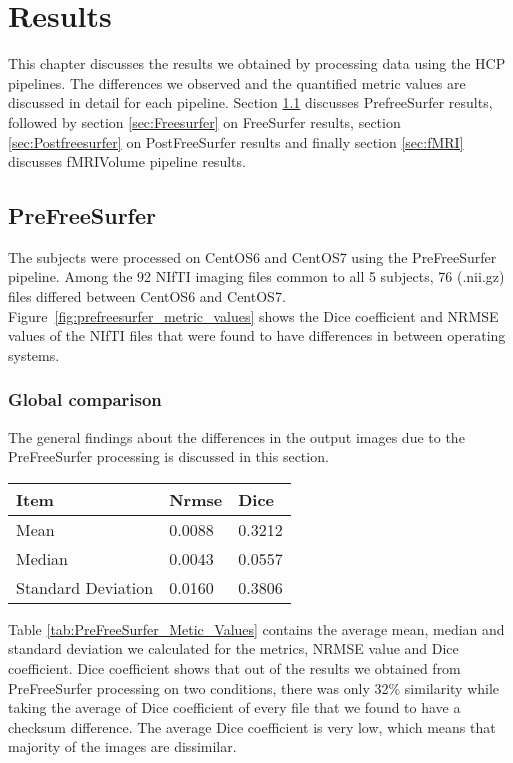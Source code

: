 \chapter{Results}\label{results}
This chapter discusses the results we obtained by processing data using the HCP pipelines. The differences we observed and the quantified metric values are discussed in detail for each pipeline. Section \ref{sec:Prefreesurfer} discusses PrefreeSurfer results, followed by section \ref{sec:Freesurfer} on FreeSurfer results, section \ref{sec:Postfreesurfer} on PostFreeSurfer results and finally section \ref{sec:fMRI} discusses fMRIVolume pipeline results.

\section{PreFreeSurfer} \label{sec:Prefreesurfer}
The subjects were processed on CentOS6 and CentOS7 using the PreFreeSurfer pipeline. Among the 92 NIfTI imaging files common to all 5 subjects, 76 (.nii.gz) files differed between CentOS6 and CentOS7. Figure~\ref{fig:prefreesurfer_metric_values} shows the Dice coefficient and NRMSE values of the NIfTI files that were found to have differences in between operating systems.

\subsection{Global comparison}
The general findings about the differences in the output images due to the PreFreeSurfer processing is discussed in this section.

\begin{center}
\begin{tabular}{|l|l|l|}
\hline
\textbf{Item}      & \textbf{Nrmse} & \textbf{Dice} \\ \hline
Mean               & 0.0088   & 0.3212   \\ \hline
Median             & 0.0043    & 0.0557    \\ \hline
Standard Deviation & 0.0160    & 0.3806   \\ \hline
\end{tabular}
\label{tab:PreFreeSurfer_Metic_Values}
\end{center}

Table \ref{tab:PreFreeSurfer_Metic_Values} contains the average mean, median and standard deviation we calculated for the metrics, NRMSE value and Dice coefficient. Dice coefficient shows that out of the results we obtained from PreFreeSurfer processing on two conditions, there was only 32\% similarity while taking the average of Dice coefficient of every file that we found to have a checksum difference. The average Dice coefficient is very low, which means that majority of the images are dissimilar.

